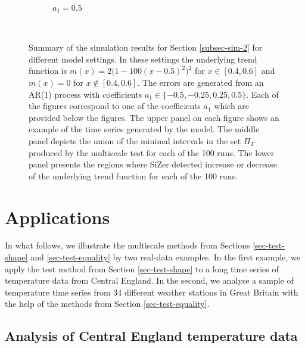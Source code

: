 \documentclass[a4paper,12pt]{article}
\begin{document}
\begin{figure}
\begin{subfigure}{.5\textwidth}
  \caption{$a_1 = 0.5$}
  \label{fig:sfig4}
\end{subfigure}\\
\caption{Summary of the simulation results for Section \ref{subsec-sim-2} for different model settings. In these settings the underlying trend function is $m(x) = 2\big(1 - 100(x - 0.5)^2\big)^2$ for $x \in [0.4, 0.6]$ and $m(x) = 0$ for $x \notin [0.4, 0.6]$. The errors are generated from an AR(1) process with coefficients $a_1 \in \{-0.5, -0.25, 0.25, 0.5\}$. Each of the figures correspond to one of the coefficients $a_1$ which are provided below the figures. The upper panel on each figure shows an example of the time series generated by the model. The middle panel depicts the union of the minimal intervals in the set $\Pi_T$ produced by the multiscale test for each of the 100 runs. The lower panel presents the regions where SiZer detected increase or decrease of the underlying trend function for each of the 100 runs.}
\label{fig:comparison_SiZer}
\end{figure}

\section{Applications}\label{sec-data}


In what follows, we illustrate the multiscale methods from Sections \ref{sec-test-shape} and \ref{sec-test-equality} by two real-data examples. In the first example, we apply the test method from Section \ref{sec-test-shape} to a long time series of temperature data from Central England. In the second, we analyse a sample of temperature time series from 34 different weather stations in Great Britain with the help of the methods from Section \ref{sec-test-equality}. 


\subsection{Analysis of Central England temperature data}\label{subsec-data-1} 
\end{document}
